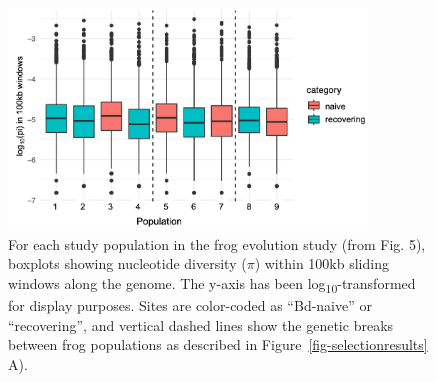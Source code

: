 \documentclass[9pt,twoside,lineno]{pnas-new}
\begin{document}
\newpage

\begin{figure}

{\centering \includegraphics[width=0.85\textwidth]{figures/boxplot_genomewide_pi_by_pop.png}

}

\caption{\label{fig-boxplot-genomewide-pi-by-pop}For each study
population in the frog evolution study (from
Fig. 5), boxplots showing nucleotide
diversity (\(\pi\)) within 100kb sliding windows along the genome. The
y-axis has been log\textsubscript{10}-transformed for display purposes.
Sites are color-coded as ``Bd-naive'' or ``recovering'', and vertical
dashed lines show the genetic breaks between frog populations as
described in Figure~\ref{fig-selectionresults} A).}

\end{figure}\clearpage

\newpage
\end{document}

